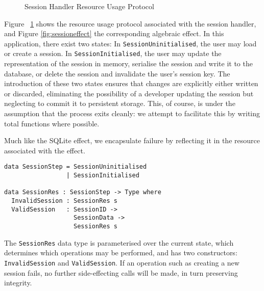 \documentclass[preprint]{sigplanconf}
\begin{document}
\begin{figure}[htpb!]
\centering
{}
\caption{Session Handler Resource Usage Protocol}
\label{fig:sessionstates}
\end{figure}

Figure ~\ref{fig:sessionstates} shows the resource usage protocol associated
with the session handler, and Figure \ref{fig:sessioneffect} the corresponding
algebraic effect. In this application, there exist two states:
In \texttt{SessionUninitialised}, the user may load or create a
session.
In \texttt{SessionInitialised}, the user may update the
representation of the session in memory, serialise the session and write it to
the database, or delete the session and invalidate the user's session key. The
introduction of these two states ensures that changes are explicitly either
written or discarded, eliminating the possibility of a developer updating the
session but neglecting to commit it to persistent storage. This, of course, is
under the assumption that the process exits cleanly: we attempt to facilitate
this by writing total functions where possible.

Much like the SQLite effect, we encapsulate failure by reflecting it in the
resource associated with the effect. 

\begin{Verbatim}
data SessionStep = SessionUninitialised
                 | SessionInitialised

data SessionRes : SessionStep -> Type where
  InvalidSession : SessionRes s  
  ValidSession   : SessionID -> 
                   SessionData -> 
                   SessionRes s
\end{Verbatim}
The \texttt{SessionRes} data type is parameterised over the current state, which determines which operations may be performed, and has two constructors: \texttt{InvalidSession} and \texttt{ValidSession}. If an operation such as creating a new session fails, no further side-effecting calls will be made, in turn preserving integrity. 
\end{document}
